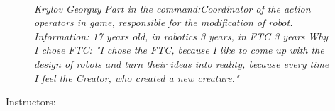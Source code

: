 \begin{figure}[H]
\begin{minipage}[h]{0.47\linewidth}
		\\
		\emph{Krylov Georguy}
			\emph{Part in the command:Coordinator of the action operators in game, responsible for the modification of robot. }
			\emph{Information: 17 years old, in robotics 3 years, in FTC 3 years }
				\emph{Why I chose FTC: "I chose the FTC, because I like to come up with the design of robots and turn their ideas into reality, because every time I feel the Creator, who created a new creature."}
	\end{minipage}
\end{figure}

\newpage

\large  Instructors:

